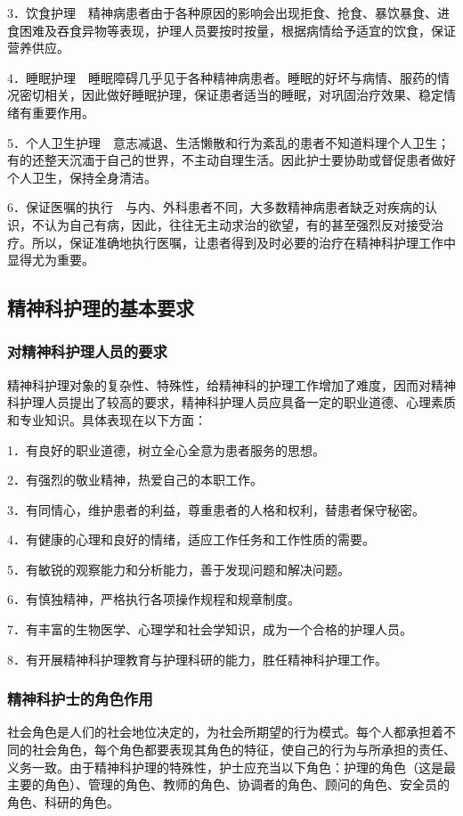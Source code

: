 3．饮食护理　精神病患者由于各种原因的影响会出现拒食、抢食、暴饮暴食、进食困难及吞食异物等表现，护理人员要按时按量，根据病情给予适宜的饮食，保证营养供应。

4．睡眠护理　睡眠障碍几乎见于各种精神病患者。睡眠的好坏与病情、服药的情况密切相关，因此做好睡眠护理，保证患者适当的睡眠，对巩固治疗效果、稳定情绪有重要作用。

5．个人卫生护理　意志减退、生活懒散和行为紊乱的患者不知道料理个人卫生；有的还整天沉湎于自己的世界，不主动自理生活。因此护士要协助或督促患者做好个人卫生，保持全身清洁。

6．保证医嘱的执行　与内、外科患者不同，大多数精神病患者缺乏对疾病的认识，不认为自己有病，因此，往往无主动求治的欲望，有的甚至强烈反对接受治疗。所以，保证准确地执行医嘱，让患者得到及时必要的治疗在精神科护理工作中显得尤为重要。

\subsection{精神科护理的基本要求}

\subsubsection{对精神科护理人员的要求}

精神科护理对象的复杂性、特殊性，给精神科的护理工作增加了难度，因而对精神科护理人员提出了较高的要求，精神科护理人员应具备一定的职业道德、心理素质和专业知识。具体表现在以下方面：

1．有良好的职业道德，树立全心全意为患者服务的思想。

2．有强烈的敬业精神，热爱自己的本职工作。

3．有同情心，维护患者的利益，尊重患者的人格和权利，替患者保守秘密。

4．有健康的心理和良好的情绪，适应工作任务和工作性质的需要。

5．有敏锐的观察能力和分析能力，善于发现问题和解决问题。

6．有慎独精神，严格执行各项操作规程和规章制度。

7．有丰富的生物医学、心理学和社会学知识，成为一个合格的护理人员。

8．有开展精神科护理教育与护理科研的能力，胜任精神科护理工作。

\subsubsection{精神科护士的角色作用}

社会角色是人们的社会地位决定的，为社会所期望的行为模式。每个人都承担着不同的社会角色，每个角色都要表现其角色的特征，使自己的行为与所承担的责任、义务一致。由于精神科护理的特殊性，护士应充当以下角色：护理的角色（这是最主要的角色）、管理的角色、教师的角色、协调者的角色、顾问的角色、安全员的角色、科研的角色。

